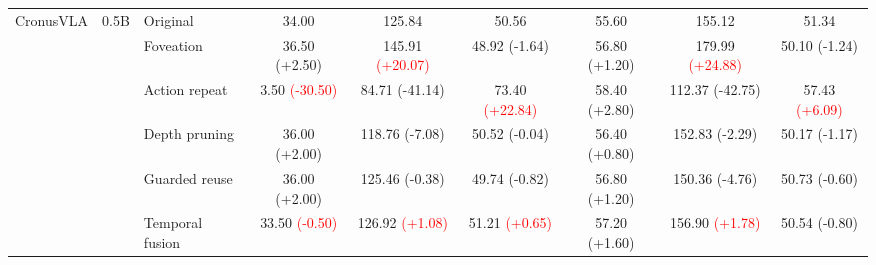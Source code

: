 \begin{table}[t]
\begin{tabular}{cclcccccc}
\multirow[c]{6}{*}{CronusVLA}
& \multirow[c]{6}{*}{0.5B}
& Original & 34.00 & 125.84 & 50.56 & 55.60 & 155.12 & 51.34 \\
& & Foveation & 36.50 {\scriptsize\textcolor{green!50!black}{(+2.50)}} & 145.91 {\scriptsize\textcolor{red}{(+20.07)}} & 48.92 {\scriptsize\textcolor{green!50!black}{(-1.64)}} & 56.80 {\scriptsize\textcolor{green!50!black}{(+1.20)}} & 179.99 {\scriptsize\textcolor{red}{(+24.88)}} & 50.10 {\scriptsize\textcolor{green!50!black}{(-1.24)}} \\
& & Action repeat & 3.50 {\scriptsize\textcolor{red}{(-30.50)}} & 84.71 {\scriptsize\textcolor{green!50!black}{(-41.14)}} & 73.40 {\scriptsize\textcolor{red}{(+22.84)}} & 58.40 {\scriptsize\textcolor{green!50!black}{(+2.80)}} & 112.37 {\scriptsize\textcolor{green!50!black}{(-42.75)}} & 57.43 {\scriptsize\textcolor{red}{(+6.09)}} \\
& & Depth pruning & 36.00 {\scriptsize\textcolor{green!50!black}{(+2.00)}} & 118.76 {\scriptsize\textcolor{green!50!black}{(-7.08)}} & 50.52 {\scriptsize\textcolor{green!50!black}{(-0.04)}} & 56.40 {\scriptsize\textcolor{green!50!black}{(+0.80)}} & 152.83 {\scriptsize\textcolor{green!50!black}{(-2.29)}} & 50.17 {\scriptsize\textcolor{green!50!black}{(-1.17)}} \\
& & Guarded reuse & 36.00 {\scriptsize\textcolor{green!50!black}{(+2.00)}} & 125.46 {\scriptsize\textcolor{green!50!black}{(-0.38)}} & 49.74 {\scriptsize\textcolor{green!50!black}{(-0.82)}} & 56.80 {\scriptsize\textcolor{green!50!black}{(+1.20)}} & 150.36 {\scriptsize\textcolor{green!50!black}{(-4.76)}} & 50.73 {\scriptsize\textcolor{green!50!black}{(-0.60)}} \\
& & Temporal fusion & 33.50 {\scriptsize\textcolor{red}{(-0.50)}} & 126.92 {\scriptsize\textcolor{red}{(+1.08)}} & 51.21 {\scriptsize\textcolor{red}{(+0.65)}} & 57.20 {\scriptsize\textcolor{green!50!black}{(+1.60)}} & 156.90 {\scriptsize\textcolor{red}{(+1.78)}} & 50.54 {\scriptsize\textcolor{green!50!black}{(-0.80)}} \\
\cmidrule(lr){1-9}


\end{tabular}
\end{table}
